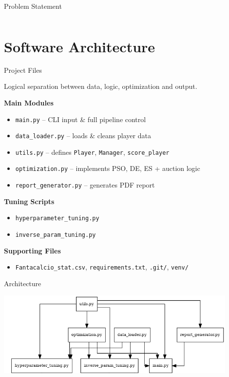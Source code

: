 \documentclass[aspectratio=169]{beamer}
\begin{document}
\begin{frame}{Problem Statement}
\begin{columns}[T,onlytextwidth]
			
		\end{columns}
	\end{frame}
\section{Software Architecture}
\begin{frame}{Project Files}

	\begin{block}{}
		Logical separation between data, logic, optimization and output.
	\end{block}
		\vspace{0.3em}
		\textbf{Main Modules}
		\begin{itemize}
			\item \texttt{main.py} – CLI input \& full pipeline control
			\item \texttt{data\_loader.py} – loads \& cleans player data
			\item \texttt{utils.py} – defines \texttt{Player}, \texttt{Manager}, \texttt{score\_player}
			\item \texttt{optimization.py} – implements PSO, DE, ES + auction logic
			\item \texttt{report\_generator.py} – generates PDF report
		\end{itemize}
		\vspace{0.3em}
		\textbf{Tuning Scripts}
		\begin{itemize}
			\item \texttt{hyperparameter\_tuning.py}
			\item \texttt{inverse\_param\_tuning.py}
		\end{itemize}
		\vspace{0.3em}
		\textbf{Supporting Files}
		\begin{itemize}
			\item \texttt{Fantacalcio\_stat.csv}, \texttt{requirements.txt}, \texttt{.git/}, \texttt{venv/}
		\end{itemize}
		

\end{frame}
\begin{frame}{Architecture}


		\includegraphics[width=0.90\textwidth]{plot/architecture_diagram.png}

\end{frame}
\end{document}
